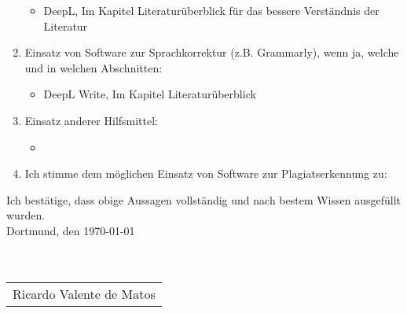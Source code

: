 \begin{enumerate}
	\begin{itemize}
		\item DeepL, Im Kapitel Literaturüberblick für das bessere Verständnis der Literatur
	\end{itemize}
	\item Einsatz von Software zur Sprachkorrektur (z.B. Grammarly), wenn ja, welche und in welchen Abschnitten:
	\begin{itemize}
		\item DeepL Write, Im Kapitel Literaturüberblick
	\end{itemize}
	\item Einsatz anderer Hilfsmittel:
	\begin{itemize}
		\item 
	\end{itemize}
	\item Ich stimme dem möglichen Einsatz von Software zur Plagiatserkennung zu:
\end{enumerate}

Ich bestätige, dass obige Aussagen vollständig und nach bestem Wissen ausgefüllt wurden.\\

Dortmund, den \today \\ \\ \\
\begin{tabular}{@{}l@{}}\hline
	Ricardo Valente de Matos
\end{tabular}